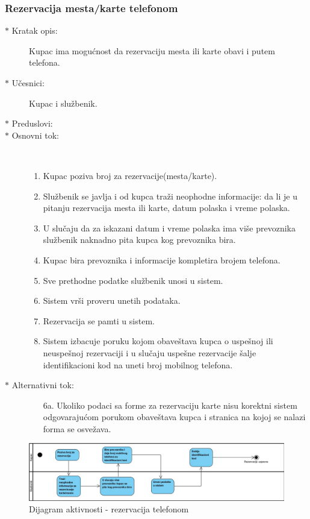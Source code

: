 \subsubsection{Rezervacija mesta/karte telefonom}
\begin{description}
	\item [$\ast$ Kratak opis: ] Kupac ima mogu\' cnost da rezervaciju mesta ili karte obavi i putem telefona.
	\item[$\ast$ U\v cesnici: ] Kupac i slu\v zbenik.
	\item[$\ast$ Preduslovi: ]
	\item[$\ast$ Osnovni tok: ] \ \\
	\renewcommand{\labelenumii}{\Roman{enumii}}
	\begin{enumerate}
		\item Kupac poziva broj za rezervacije(mesta/karte).
		\item Slu\v zbenik se javlja i od kupca tra\v zi neophodne informacije: da li je u pitanju rezervacija mesta ili karte, datum polaska i vreme polaska.
		\item U slu\v caju da za iskazani datum i vreme polaska ima vi\v se prevoznika slu\v zbenik naknadno pita kupca kog prevoznika bira.
		\item Kupac bira prevoznika i informacije kompletira brojem telefona.
		\item Sve prethodne podatke slu\v zbenik unosi u sistem.
		\item Sistem vr\v si proveru unetih podataka.
		\item Rezervacija se pamti u sistem.
		\item Sistem izbacuje poruku kojom obave\v stava kupca o uspe\v snoj ili neuspe\v snoj rezervaciji i u slu\v caju uspe\v sne rezervacije \v salje identifikacioni kod na uneti broj mobilnog telefona.		
	\end{enumerate}
	\item[$\ast$ Alternativni tok: ]
	\begin{enumerate}
		\item[6a. ] Ukoliko podaci sa forme za rezervaciju karte nisu korektni sistem odgovaraju\' com porukom obave\v stava kupca i stranica na kojoj se nalazi forma se osve\v zava.
	\end{enumerate}
\end{description}
\begin{figure}
	\centering
	\includegraphics[width=1.1\linewidth]{../Slike/rezervacijaTelefonom}
	\caption{Dijagram aktivnosti - rezervacija telefonom}
	\label{fig:rezervacijatelefonom}
\end{figure}	
\newpage
